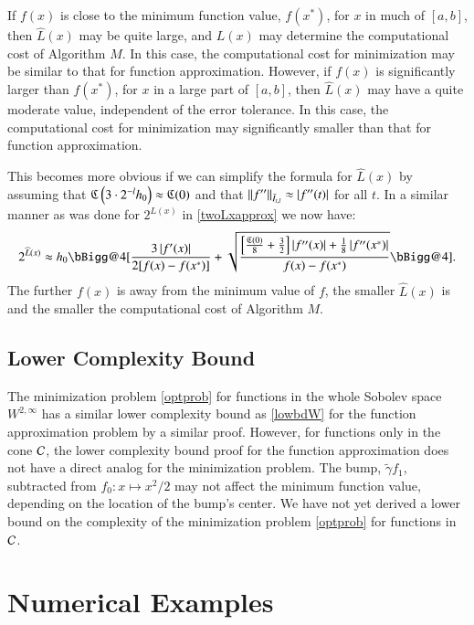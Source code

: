 \documentclass[review]{elsarticle}
\makeatletter
\newcommand{\vast}{\bBigg@{4}}
\theoremstyle{definition}
\newcommand{\vastl}{\mathopen\vast}
\newcommand{\vastr}{\mathclose\vast}
\renewcommand{\cw}{W}
\newcommand{\chL}{\widehat{L}}
\newcommand{\tgamma}{\widetilde{\gamma}}
\makeatother
\begin{document}
If $f(x)$ is close to the minimum function value, $f(x^*)$, for $x$ in much of
$[a,b]$, then $\chL(x)$ may be quite large, and $L(x)$ may determine the
computational cost of Algorithm $M$. In this case, the computational cost for
minimization may be similar to that for function approximation. However, if
$f(x)$ is significantly larger than $f(x^*)$, for $x$ in a large part of
$[a,b]$, then $\chL(x)$ may have a quite moderate value, independent of the
error tolerance. In this case, the computational cost for minimization may
significantly smaller than that for function approximation.

This becomes more obvious if we can simplify the formula for $\chL(x)$ by
assuming that $\fC\left(3\cdot2^{-l}h_0\right) \approx \fC(0)$ and that
$\norm[\bar{I}_{t,l}]{f''} \approx \abs{f''(t)}$ for all $t$. In a similar
manner as was done for $2^{L(x)}$ in \eqref{twoLxapprox} we now have:
\begin{equation*}
 2^{\chL(x)}
\approx h_0\vastl[\frac{3 \abs{f'(x)}}{2[f(x) - f(x^*)]}
+  \sqrt{\frac{\Bigl[\frac {\fC\left(0\right)}8  + \frac 32 \Bigr]  \abs{f''(x)} + \frac18\abs{f''(x^*)} }{f(x) - f(x^*)}} \vastr].
\end{equation*}
The further $f(x)$ is away from the minimum value of $f$, the smaller $\chL(x)$
is and the smaller the computational cost of Algorithm $M$.

\subsection{Lower Complexity Bound} \label{subsec:optcomp}

The minimization problem \eqref{optprob} for functions in the whole Sobolev
space $\cw^{2,\infty}$ has a similar lower complexity bound as \eqref{lowbdW}
for the function approximation problem by a similar proof. However, for
functions only in the cone $\cc$, the lower complexity bound proof for the
function approximation does not have a direct analog for the minimization
problem. The bump, $\tgamma f_1$, subtracted from $f_0: x \mapsto x^2/2$ may not
affect the minimum function value, depending on the location of the bump's
center. We have not yet derived a lower bound on the complexity of the
minimization problem \eqref{optprob} for functions in $\cc$.

\section{Numerical Examples} \label{sec:examples}
\end{document}
